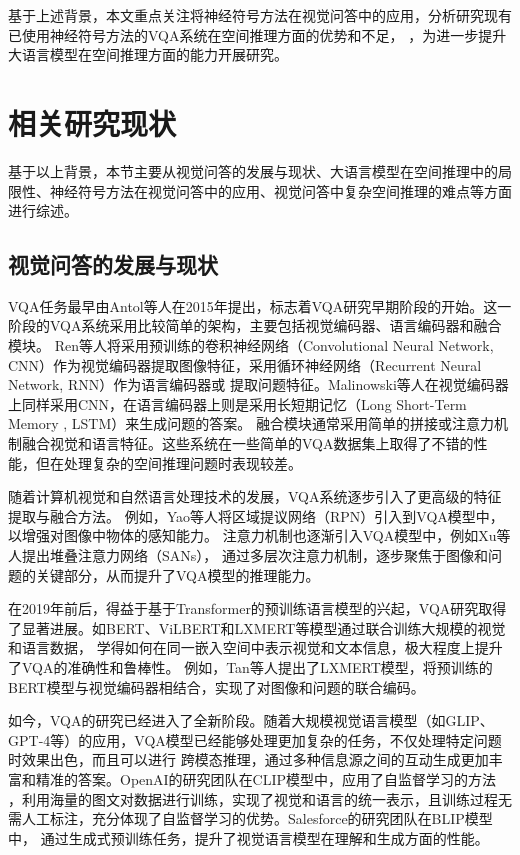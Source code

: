 基于上述背景，本文重点关注将神经符号方法在视觉问答中的应用，分析研究现有已使用神经符号方法的VQA系统在空间推理方面的优势和不足，
，为进一步提升大语言模型在空间推理方面的能力开展研究。

\section{相关研究现状}
基于以上背景，本节主要从视觉问答的发展与现状、大语言模型在空间推理中的局限性、神经符号方法在视觉问答中的应用、视觉问答中复杂空间推理的难点等方面进行综述。

\subsection{视觉问答的发展与现状}
VQA任务最早由Antol\cite{Antol2015VQA}等人在2015年提出，标志着VQA研究早期阶段的开始。这一阶段的VQA系统采用比较简单的架构，主要包括视觉编码器、语言编码器和融合模块。
Ren\cite{ren2015exploring}等人将采用预训练的卷积神经网络（Convolutional Neural Network, CNN）作为视觉编码器提取图像特征，采用循环神经网络（Recurrent Neural Network, RNN）作为语言编码器或
提取问题特征。Malinowski\cite{malinowski2015neural}等人在视觉编码器上同样采用CNN，在语言编码器上则是采用长短期记忆（Long Short-Term Memory , LSTM）来生成问题的答案。
融合模块通常采用简单的拼接或注意力机制融合视觉和语言特征。这些系统在一些简单的VQA数据集上取得了不错的性能，但在处理复杂的空间推理问题时表现较差。

随着计算机视觉和自然语言处理技术的发展，VQA系统逐步引入了更高级的特征提取与融合方法。
例如，Yao\cite{lu2019look}等人将区域提议网络（RPN）引入到VQA模型中，以增强对图像中物体的感知能力。
注意力机制也逐渐引入VQA模型中，例如Xu\cite{xu2016stacked}等人提出堆叠注意力网络（SANs），
通过多层次注意力机制，逐步聚焦于图像和问题的关键部分，从而提升了VQA模型的推理能力。

在2019年前后，得益于基于Transformer的预训练语言模型的兴起，VQA研究取得了显著进展。如BERT、ViLBERT和LXMERT等模型通过联合训练大规模的视觉和语言数据，
学得如何在同一嵌入空间中表示视觉和文本信息，极大程度上提升了VQA的准确性和鲁棒性。
例如，Tan\cite{Tan2019LXMERT}等人提出了LXMERT模型，将预训练的BERT模型与视觉编码器相结合，实现了对图像和问题的联合编码。

如今，VQA的研究已经进入了全新阶段。随着大规模视觉语言模型（如GLIP、GPT-4等）的应用，VQA模型已经能够处理更加复杂的任务，不仅处理特定问题时效果出色，而且可以进行
跨模态推理，通过多种信息源之间的互动生成更加丰富和精准的答案。OpenAI的研究团队\cite{radford2021learning}在CLIP模型中，应用了自监督学习的方法
，利用海量的图文对数据进行训练，实现了视觉和语言的统一表示，且训练过程无需人工标注，充分体现了自监督学习的优势。Salesforce的研究团队\cite{li2022blip}在BLIP模型中，
通过生成式预训练任务，提升了视觉语言模型在理解和生成方面的性能。

